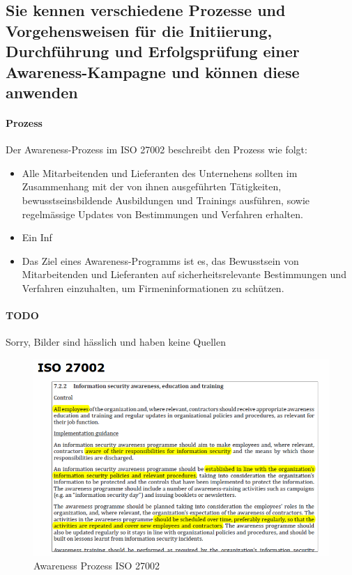 \documentclass[10pt,a4paper]{article}
\begin{document}
\subsection*{Sie kennen verschiedene Prozesse und Vorgehensweisen für die Initiierung, Durchführung und Erfolgsprüfung einer Awareness-Kampagne und können diese anwenden}
\paragraph*{Prozess}\label{para:Awareness-Prozess}Der Awareness-Prozess im ISO 27002 beschreibt den Prozess wie folgt:
\begin{itemize}[noitemsep,topsep=0pt,leftmargin=*]
    \item Alle Mitarbeitenden und Lieferanten des Unternehens sollten im Zusammenhang mit der von ihnen ausgeführten Tätigkeiten, bewusstseinsbildende Ausbildungen und Trainings ausführen, sowie regelmässige Updates von Bestimmungen und Verfahren erhalten.
    \item Ein Inf
    \item Das Ziel eines Awareness-Programms ist es, das Bewusstsein von Mitarbeitenden und Lieferanten auf sicherheitsrelevante Bestimmungen und Verfahren einzuhalten, um Firmeninformationen zu schützen.
\end{itemize}

\paragraph*{TODO}Sorry, Bilder sind hässlich und haben keine Quellen
\begin{figure}[H]
    \begin{center}
    \includegraphics[width=15cm]{images/Awareness_Prozess_ISO.png}
    \caption{Awareness Prozess ISO 27002}
    \label{Awareness Prozess ISO 27002}
    \end{center}
\end{figure}
\end{document}
